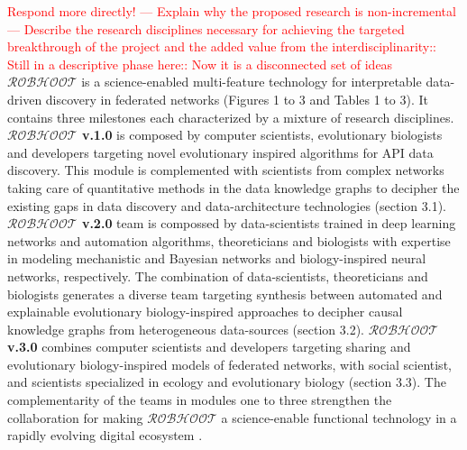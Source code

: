 \documentclass[11pt, a4paper]{article} %
\begin{document}
\textcolor{red}{Respond more directly! --- Explain why the proposed
  research is non-incremental --- Describe the research disciplines
  necessary for achieving the targeted breakthrough of the project and
  the added value from the interdisciplinarity:: Still in a
  descriptive phase here:: Now it is a disconnected set of ideas} {\bf
  $\mathcal{ROBHOOT}$} is a science-enabled multi-feature technology
for interpretable data-driven discovery in federated networks (Figures
1 to 3 and Tables 1 to 3). It contains three milestones each
characterized by a mixture of research disciplines. {\bf
  $\mathcal{ROBHOOT}$ v.1.0} is composed by computer scientists,
evolutionary biologists and developers targeting novel evolutionary
inspired algorithms for API data discovery. This module is
complemented with scientists from complex networks taking care of
quantitative methods in the data knowledge graphs to decipher the
existing gaps in data discovery and data-architecture technologies
(section 3.1). {\bf $\mathcal{ROBHOOT}$ v.2.0} team is compossed by
data-scientists trained in deep learning networks and automation
algorithms, theoreticians and biologists with expertise in modeling
mechanistic and Bayesian networks and biology-inspired neural
networks, respectively. The combination of data-scientists,
theoreticians and biologists generates a diverse team targeting
synthesis between automated and explainable evolutionary
biology-inspired approaches to decipher causal knowledge graphs from
heterogeneous data-sources (section 3.2). {\bf $\mathcal{ROBHOOT}$
  v.3.0} combines computer scientists and developers targeting sharing
and evolutionary biology-inspired models of federated networks, with
social scientist, and scientists specialized in ecology and
evolutionary biology (section 3.3). The complementarity of the teams
in modules one to three strengthen the collaboration for making
$\mathcal{ROBHOOT}$ a science-enable functional technology in a
rapidly evolving digital ecosystem \citep{Soto-Valero2019}.
\end{document}
